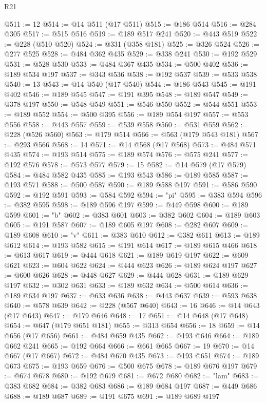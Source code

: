 \begin{lexlean}{R21}
\begin{coremodule}
@511 := 12
@514 := @14 @511 (@17 @511)
@515 := @186 @514
@516 := @284 @305
@517 := @515 @516
@519 := @189 @517 @241
@520 := @443 @519
@522 := @228 (@510 @520)
@524 := @331 (@358 @181)
@525 := @326 @524
@526 := @277 @525
@528 := @484 @362 @435
@529 := @338 @241
@530 := @192 @529
@531 := @528 @530
@533 := @484 @367 @435
@534 := @500 @402
@536 := @189 @534 @197
@537 := @343 @536
@538 := @192 @537
@539 := @533 @538
@540 := 13
@543 := @14 @540 (@17 @540)
@544 := @186 @543
@545 := @191 @402
@546 := @189 @545
@547 := @191 @395
@548 := @189 @547
@549 := @378 @197
@550 := @548 @549
@551 := @546 @550
@552 := @544 @551
@553 := @189 @552
@554 := @500 @395
@556 := @189 @554 @197
@557 := @553 @556
@558 := @443 @557
@559 := @539 @558
@560 := @531 @559
@562 := @228 (@526 @560)
@563 := @179 @514
@566 := @563 (@179 @543 @181)
@567 := @293 @566
@568 := 14
@571 := @14 @568 (@17 @568)
@573 := @484 @571 @435
@574 := @193 @514
@575 := @189 @574
@576 := @575 @241
@577 := @192 @576
@578 := @573 @577
@579 := 15
@582 := @14 @579 (@17 @579)
@584 := @484 @582 @435
@585 := @193 @543
@586 := @189 @585
@587 := @193 @571
@588 := @500 @587
@590 := @189 @588 @197
@591 := @586 @590
@592 := @192 @591
@593 := @584 @592
@594 := "pi"
@595 := @383 @594
@596 := @382 @595
@598 := @189 @596 @197
@599 := @449 @598
@600 := @189 @599
@601 := "b"
@602 := @383 @601
@603 := @382 @602
@604 := @189 @603
@605 := @191 @587
@607 := @189 @605 @197
@608 := @282 @607
@609 := @189 @608
@610 := "v"
@611 := @383 @610
@612 := @382 @611
@613 := @189 @612
@614 := @193 @582
@615 := @191 @614
@617 := @189 @615 @466
@618 := @613 @617
@619 := @444 @618
@621 := @189 @619 @197
@622 := @609 @621
@623 := @604 @622
@624 := @444 @623
@626 := @189 @624 @197
@627 := @600 @626
@628 := @448 @627
@629 := @444 @628
@631 := @189 @629 @197
@632 := @302 @631
@633 := @189 @632
@634 := @500 @614
@636 := @189 @634 @197
@637 := @633 @636
@638 := @443 @637
@639 := @593 @638
@640 := @578 @639
@642 := @228 (@567 @640)
@643 := 16
@646 := @14 @643 (@17 @643)
@647 := @179 @646
@648 := 17
@651 := @14 @648 (@17 @648)
@654 := @647 (@179 @651 @181)
@655 := @313 @654
@656 := 18
@659 := @14 @656 (@17 @656)
@661 := @484 @659 @435
@662 := @193 @646
@664 := @189 @662 @241
@665 := @192 @664
@666 := @661 @665
@667 := 19
@670 := @14 @667 (@17 @667)
@672 := @484 @670 @435
@673 := @193 @651
@674 := @189 @673
@675 := @193 @659
@676 := @500 @675
@678 := @189 @676 @197
@679 := @674 @678
@680 := @192 @679
@681 := @672 @680
@682 := "lam"
@683 := @383 @682
@684 := @382 @683
@686 := @189 @684 @197
@687 := @449 @686
@688 := @189 @687
@689 := @191 @675
@691 := @189 @689 @197

\end{coremodule}
\end{lexlean}
